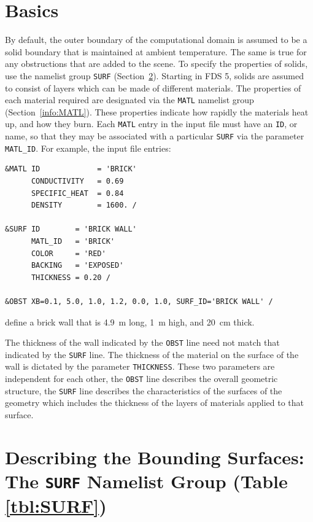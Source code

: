 \documentclass[11pt]{book}
\newcommand{\ct}{\tt\small}
\begin{document}
\section{Basics}

By default, the outer boundary of the computational domain is assumed
to be a solid boundary that is maintained at ambient temperature. The
same is true for any obstructions that are added to the scene. To
specify the properties of solids, use the namelist group {\ct SURF}
(Section~\ref{info:SURF}). Starting in FDS 5, solids are assumed to
consist of layers which can be made of different materials.  The
properties of each material required are designated via the {\ct MATL}
namelist group (Section~\ref{info:MATL}).  These properties indicate how
rapidly the materials heat up, and how they burn.  Each {\ct MATL}
entry in the input file must have an {\ct ID}, or name, so that they
may be associated with a particular {\ct SURF} via the parameter {\ct
MATL\_ID}.  For example, the input file entries:

\footnotesize
\begin{verbatim}
&MATL ID             = 'BRICK'
      CONDUCTIVITY   = 0.69
      SPECIFIC_HEAT  = 0.84
      DENSITY        = 1600. /

&SURF ID        = 'BRICK WALL'
      MATL_ID   = 'BRICK'
      COLOR     = 'RED'
      BACKING   = 'EXPOSED'
      THICKNESS = 0.20 /

&OBST XB=0.1, 5.0, 1.0, 1.2, 0.0, 1.0, SURF_ID='BRICK WALL' /
\end{verbatim}
\normalsize

\noindent
define a brick wall that is 4.9~m long, 1~m high, and 20~cm thick.
\begin{warning}
\noindent
The thickness of the wall indicated by the {\ct OBST} line need not
match that indicated by the {\ct SURF} line. The thickness of the material on the surface of the wall
is dictated by the parameter {\ct THICKNESS}.  These two parameters are independent for each other,
the {\ct OBST} line describes the overall geometric structure, the {\ct SURF} line describes the
characteristics of the surfaces of the geometry which includes the thickness of the layers of
materials applied to that surface.
\end{warning}

\section{Describing the Bounding Surfaces: The \texorpdfstring{{\tt SURF}}{SURF} Namelist Group (Table \ref{tbl:SURF})}
\label{info:SURF}
\end{document}
